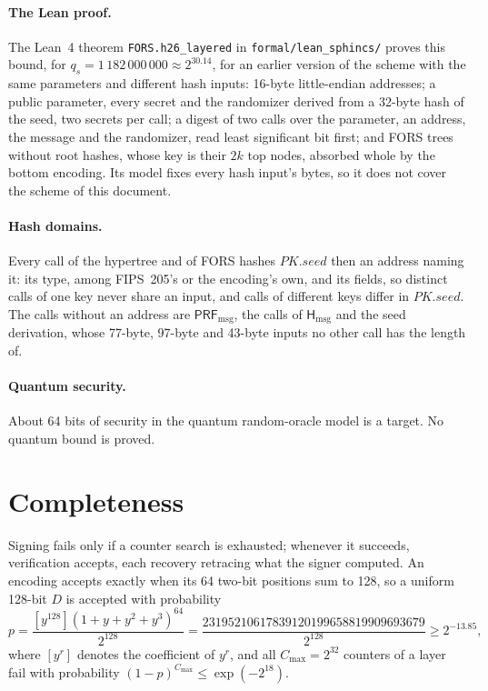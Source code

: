 \documentclass[11pt]{article}
\newcommand{\PRFmsg}{\mathsf{PRF}_{\mathrm{msg}}}
\newcommand{\Hmsg}{\mathsf{H}_{\mathrm{msg}}}
\newcommand{\pkseed}{\mathit{PK.seed}}
\newcommand{\cmax}{C_{\max}}
\begin{document}
\paragraph{The Lean proof.}
The Lean~4 theorem \texttt{FORS.h26\_layered} in \texttt{formal/lean\_sphincs/} proves this bound, for $q_s=1\,182\,000\,000\approx2^{30.14}$, for an earlier version of the scheme with the same parameters and different hash inputs: 16-byte little-endian addresses; a public parameter, every secret and the randomizer derived from a 32-byte hash of the seed, two secrets per call; a digest of two calls over the parameter, an address, the message and the randomizer, read least significant bit first; and FORS trees without root hashes, whose key is their $2k$ top nodes, absorbed whole by the bottom encoding. Its model fixes every hash input's bytes, so it does not cover the scheme of this document.

\paragraph{Hash domains.}
Every call of the hypertree and of FORS hashes $\pkseed$ then an address naming it: its type, among FIPS~205's or the encoding's own, and its fields, so distinct calls of one key never share an input, and calls of different keys differ in $\pkseed$. The calls without an address are $\PRFmsg$, the calls of $\Hmsg$ and the seed derivation, whose 77-byte, 97-byte and 43-byte inputs no other call has the length of.

\paragraph{Quantum security.}
About 64 bits of security in the quantum random-oracle model is a target. No quantum bound is proved.

\section{Completeness}
\label{sec:completeness}

Signing fails only if a counter search is exhausted; whenever it succeeds, verification accepts, each recovery retracing what the signer computed. An encoding accepts exactly when its 64 two-bit positions sum to 128, so a uniform 128-bit $D$ is accepted with probability
\[
  p=\frac{[y^{128}](1+y+y^2+y^3)^{64}}{2^{128}}
  =\frac{23195210617839120199658819909693679}{2^{128}}
  \geq2^{-13.85},
\]
where $[y^r]$ denotes the coefficient of $y^r$, and all $\cmax=2^{32}$ counters of a layer fail with probability $(1-p)^{\cmax}\leq\exp(-2^{18})$.
\end{document}
